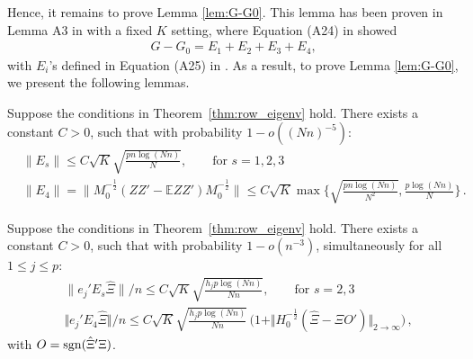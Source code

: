 \documentclass[preprint,11pt]{article}
\numberwithin{equation}{section}
\begin{document}
Hence, it remains to prove Lemma \ref{lem:G-G0}. This lemma has been proven in Lemma A3 in \cite{ke2024entry} with a fixed $K$ setting, where Equation (A24) in \cite{ke2024entry} showed
\begin{align*}
    G-G_0 = E_1+E_2+E_3+E_4,
\end{align*}
with $E_i$'s defined in Equation (A25) in \cite{ke2024entry}. As a result, to prove Lemma \ref{lem:G-G0}, we present the following lemmas.
\begin{lemma}\label{lem:tech1}
Suppose the conditions in Theorem~\ref{thm:row_eigenv} hold. There exists a constant $C>0$, such that with probability $1- o((Nn)^{-5})$:
\begin{align}
&\| E_s\| \leq C\sqrt{K}\sqrt{\frac{pn\log (Nn)}{N}}, 
\qquad \text{for $s=1, 2,3$}
\label{eq:tech11}\\
& \| E_4 \|  = \| M_0^{-\frac12} (ZZ' - \mathbb{E} ZZ') M_0^{-\frac 12}\| \leq C\sqrt{K} \max\Big\{ \sqrt{\frac{pn\log (Nn)}{N^2}}, \frac{p\log (Nn)}{N}\Big\}\, . \label{eq:tech2_E4}
\end{align}
\end{lemma}

\begin{lemma}\label{lem:tech2}
Suppose the conditions in Theorem~\ref{thm:row_eigenv} hold. There exists a constant $C>0$, such that with probability $1- o(n^{-3})$, simultaneously for all $1\leq j \leq p$:
\begin{align}
 & \| e_j' E_s\hat \Xi\|/n \leq C\sqrt{K}\sqrt{\frac{h_jp\log (Nn)}{Nn}}, 
\qquad \text{for $s=2,3$} \label{eq:entryE23} \\
&  \Vert e_j' E_4 \hat \Xi  \Vert /n  \leq  C\sqrt{K}\sqrt{\frac{h_j p\log (Nn)}{Nn}} \,  \Big(1 +  \Vert H_0^{-\frac 12} (\hat \Xi- \Xi O')\Vert_{2\to \infty} \Big) \,, \label{eq:tech2_entryE4}
\end{align}
with $O = {\rm sgn} (\hat \Xi'\Xi )$. 
\end{lemma}
\end{document}
